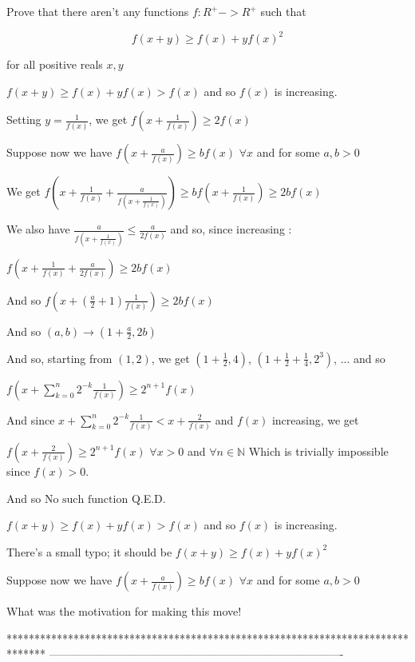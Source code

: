 \begin{solution}
	\begin{tcolorbox}Prove that there aren't any functions $f : R^{+} ->R^{+}$ such that

$$f(x+y) \geq f(x)+yf(x)^2$$

for all positive reals $x,y$\end{tcolorbox}
$f(x+y)\ge f(x)+yf(x)>f(x)$ and so $f(x)$ is increasing.

Setting $y=\frac 1{f(x)}$, we get $f(x+\frac 1{f(x)})\ge 2f(x)$

Suppose now we have $f(x+\frac a{f(x)})\ge bf(x)$ $\forall x$ and for some $a,b>0$

We get $f(x+\frac 1{f(x)}+\frac a{f(x+\frac 1{f(x)})})\ge bf(x+\frac 1{f(x)})\ge 2bf(x)$

We also have $\frac a{f(x+\frac 1{f(x)})}\le \frac a{2f(x)}$ and so, since increasing :

$f(x+\frac 1{f(x)}+\frac a{2f(x)})\ge 2bf(x)$

And so $f(x+(\frac a2+1)\frac 1{f(x)})\ge 2bf(x)$

And so $(a,b)\to(1+\frac a2,2b)$

And so, starting from $(1,2)$, we get $(1+\frac 12,4)$, $(1+\frac 12+\frac 14,2^3)$, ... and so 

$f(x+\sum_{k=0}^n2^{-k}\frac 1{f(x)})\ge 2^{n+1}f(x)$

And since $x+\sum_{k=0}^n2^{-k}\frac 1{f(x)}<x+\frac 2{f(x)}$ and $f(x)$ increasing, we get 

$f(x+\frac 2{f(x)})\ge 2^{n+1} f(x)$ $\forall x>0$ and $\forall n\in\mathbb N$
Which is trivially impossible since $f(x)>0$.

And so $\boxed{\text{No such function}}$
Q.E.D.


\end{solution}



\begin{solution}
	\begin{tcolorbox}
$f(x+y)\ge f(x)+yf(x)>f(x)$ and so $f(x)$ is increasing.
\end{tcolorbox}
There's a small typo; it should be $f(x+y)\ge f(x)+yf(x)^{2}$

\end{solution}



\begin{solution}
	\begin{tcolorbox}
Suppose now we have $f(x+\frac a{f(x)})\ge bf(x)$ $\forall x$ and for some $a,b>0$
\end{tcolorbox}
What was the motivation for making this move!

\end{solution}
*******************************************************************************
-------------------------------------------------------------------------------

